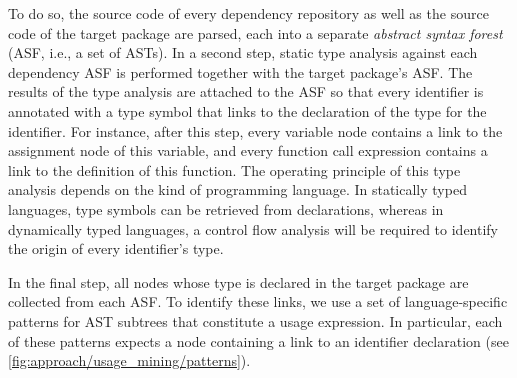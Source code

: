 \documentclass[a4paper,twoside]{article}
\begin{document}
To do so, the source code of every dependency repository as well as the source code of the target package are parsed, each into a separate \emph{abstract syntax forest} (ASF, i.e., a set of ASTs).
In a second step, static type analysis against each dependency ASF is performed together with the target package's ASF.
The results of the type analysis are attached to the ASF so that every identifier is annotated with a type symbol that links to the declaration of the type for the identifier.
For instance, after this step, every variable node contains a link to the assignment node of this variable, and every function call expression contains a link to the definition of this function.
The operating principle of this type analysis depends on the kind of programming language.
In statically typed languages, type symbols can be retrieved from declarations, whereas in dynamically typed languages, a control flow analysis will be required to identify the origin of every identifier's type.

In the final step, all nodes whose type is declared in the target package are collected from each ASF.
To identify these links, we use a set of language-specific patterns for AST subtrees that constitute a usage expression.
In particular, each of these patterns expects a node containing a link to an identifier declaration (see \cref{fig:approach/usage_mining/patterns}).
\end{document}

